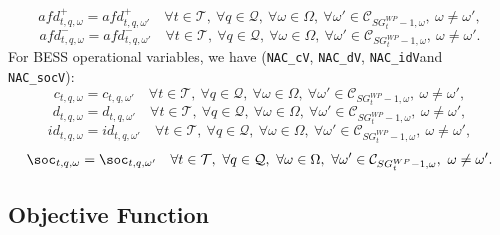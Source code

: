 \begin{equation} \label{EQ:NAC_var_afd_p2}
	afd^+_{t,q, \omega} = afd^+_{t, q,\omega'} \quad \forall t \in \mathcal{T}, \ \forall q \in \mathcal{Q}, \ \forall \omega \in \Omega, \ \forall \omega' \in \mathcal{C}_{SG^{WP}_t - 1, \omega}, \ \omega \neq \omega',
\end{equation}
\begin{equation} \label{EQ:NAC_var_afd_m2}
	afd^-_{t,q, \omega} = afd^-_{t, q,\omega'} \quad \forall t \in \mathcal{T}, \ \forall q \in \mathcal{Q}, \ \forall \omega \in \Omega, \ \forall \omega' \in \mathcal{C}_{SG^{WP}_t - 1, \omega}, \ \omega \neq \omega'.
\end{equation}
For BESS operational variables, we have (\verb|NAC_cV|, \verb|NAC_dV|, \verb|NAC_idV|and \verb|NAC_socV|):
\begin{equation} \label{EQ:NAC_cV2}
	c_{t, q,\omega} = c_{t,q, \omega'} \quad \forall t \in \mathcal{T}, \ \forall q \in \mathcal{Q},  \ \forall \omega \in \Omega, \ \forall \omega' \in \mathcal{C}_{SG^{WP}_t - 1, \omega}, \ \omega \neq \omega',
\end{equation}
\begin{equation} \label{EQ:NAC_dV2}
	d_{t, q,\omega} = d_{t,q, \omega'} \quad \forall t \in \mathcal{T}, \ \forall q \in \mathcal{Q}, \ \forall \omega \in \Omega, \ \forall \omega' \in \mathcal{C}_{SG^{WP}_t - 1, \omega}, \ \omega \neq \omega',
\end{equation}
\begin{equation} \label{EQ:NAC_idV2}
	id_{t,q, \omega} = id_{t, q,\omega'} \quad \forall t \in \mathcal{T}, \ \forall q \in \mathcal{Q}, \ \forall \omega \in \Omega, \ \forall \omega' \in \mathcal{C}_{SG^{WP}_t - 1, \omega}, \ \omega \neq \omega',
\end{equation}
\begin{equation} \label{EQ:NAC_socV2}
	\soc_{t,q, \omega} = \soc_{t,q, \omega'} \quad \forall t \in \mathcal{T}, \ \forall q \in \mathcal{Q}, \ \forall \omega \in \Omega, \ \forall \omega' \in \mathcal{C}_{SG^{WP}_t - 1, \omega}, \ \omega \neq \omega'.
\end{equation}

\subsection{Objective Function}
\label{SEC:ObjectiveFunction2}


